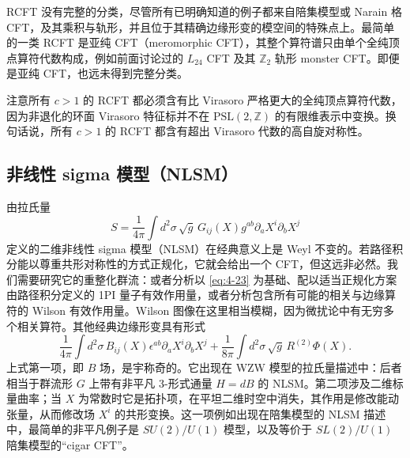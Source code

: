 RCFT 没有完整的分类，尽管所有已明确知道的例子都来自陪集模型或 Narain 格 CFT，及其乘积与轨形，并且位于其精确边缘形变的模空间的特殊点上。最简单的一类 RCFT 是亚纯 CFT（meromorphic CFT），其整个算符谱只由单个全纯顶点算符代数构成，例如前面讨论过的 $L_{24}$ CFT 及其 $\mathbb{Z}_2$ 轨形 monster CFT。即便是亚纯 CFT，也远未得到完整分类。

注意所有 $c>1$ 的 RCFT 都必须含有比 Virasoro 严格更大的全纯顶点算符代数，因为非退化的环面 Virasoro 特征标并不在 $\mathrm{PSL}(2,\mathbb{Z})$ 的有限维表示中变换。换句话说，所有 $c>1$ 的 RCFT 都含有超出 Virasoro 代数的高自旋对称性。

\subsection{非线性 sigma 模型（NLSM）}\label{sec:4-5}

由拉氏量
\begin{equation}
  \label{eq:4-23}
  S=\frac{1}{4\pi}\int d^2\sigma\,\sqrt{g}\,G_{ij}(X)g^{ab}\partial_a X^i\partial_b X^j
\end{equation}
定义的二维非线性 sigma 模型（NLSM）在经典意义上是 Weyl 不变的。若路径积分能以尊重共形对称性的方式正规化，它就会给出一个 CFT，但这远非必然。我们需要研究它的重整化群流：或者分析以 \eqref{eq:4-23} 为基础、配以适当正规化方案由路径积分定义的 1PI 量子有效作用量，或者分析包含所有可能的相关与边缘算符的 Wilson 有效作用量。Wilson 图像在这里相当模糊，因为微扰论中有无穷多个相关算符。其他经典边缘形变具有形式
\begin{equation}
  \label{eq:4-24}
  \frac{1}{4\pi}\int d^2\sigma\,B_{ij}(X)\epsilon^{ab}\partial_a X^i\partial_b X^j+\frac{1}{8\pi}\int d^2\sigma\,\sqrt{g}\,R^{(2)}\Phi(X).
\end{equation}
上式第一项，即 $B$ 场，是宇称奇的。它出现在 WZW 模型的拉氏量描述中：后者相当于群流形 $G$ 上带有非平凡 3-形式通量 $H=dB$ 的 NLSM。第二项涉及二维标量曲率；当 $X$ 为常数时它是拓扑项，在平坦二维时空中消失，其作用是修改能动张量，从而修改场 $X^i$ 的共形变换。这一项例如出现在陪集模型的 NLSM 描述中，最简单的非平凡例子是 $SU(2)/U(1)$ 模型，以及等价于 $SL(2)/U(1)$ 陪集模型的“cigar CFT”。


